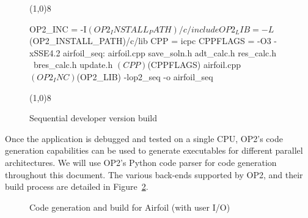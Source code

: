 \documentclass[11pt]{article}
\begin{document}
\begin{figure}[!h]\small
\vspace{-0pt}\noindent\line(1,0){8}\vspace{-20pt}
\begin{pyglist}[language=make]
OP2_INC         = -I$(OP2_INSTALL_PATH)/c/include
OP2_LIB         = -L$(OP2_INSTALL_PATH)/c/lib
CPP             = icpc
CPPFLAGS        = -O3 -xSSE4.2
airfoil_seq: airfoil.cpp save_soln.h adt_calc.h res_calc.h \
	     bres_calc.h update.h
             $(CPP) $(CPPFLAGS) airfoil.cpp \
             $(OP2_INC) $(OP2_LIB) -lop2_seq -o airfoil_seq 
\end{pyglist}
\vspace{-10pt}\noindent\line(1,0){8}\vspace{-10pt}
\caption{\small Sequential developer version build }
\normalsize\vspace{-0pt}\label{fig:seqbuild}
\end{figure}

\noindent Once the application is debugged and tested on a single CPU, OP2's code generation capabilities can be used
to generate executables for different parallel architectures. We will use OP2's Python code parser for code generation
throughout this document. The various back-ends supported by OP2, and their build process are detailed in
Figure~\ref{fig/build-paths}. 

\begin{figure}[!ht]\centering\vspace{0pt}
\caption{Code generation and build for Airfoil (with user I/O)}\label{fig/build-paths}\vspace{-5pt}
\end{figure}
\end{document}
